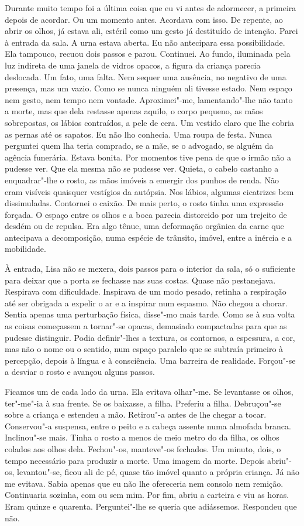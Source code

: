 Durante muito tempo foi a última coisa que eu vi antes de adormecer, a
primeira depois de acordar. Ou um momento antes. Acordava com isso. De
repente, ao abrir os olhos, já estava ali, estéril como um gesto já
destituído de intenção. Parei à entrada da sala. A urna estava aberta.
Eu não antecipara essa possibilidade. Ela tampouco, recuou dois passos
e parou. Continuei. Ao fundo, iluminada pela luz indireta de uma janela
de vidros opacos, a figura da criança parecia deslocada. Um fato, uma
falta. Nem sequer uma ausência, no negativo de uma presença, mas um
vazio. Como se nunca ninguém ali tivesse estado. Nem espaço nem gesto,
nem tempo nem vontade. Aproximei"-me, lamentando"-lhe não tanto a morte,
mas que dela restasse apenas aquilo, o corpo pequeno, as mãos
sobrepostas, os lábios contraídos, a pele de cera. Um vestido claro que
lhe cobria as pernas até os sapatos. Eu não lho conhecia. Uma roupa de
festa. Nunca perguntei quem lha teria comprado, se a mãe, se o advogado,
se alguém da agência funerária. Estava bonita. Por momentos tive pena de
que o irmão não a pudesse ver. Que ela mesma não se pudesse ver. Quieta,
o cabelo castanho a enquadrar"-lhe o rosto, as mãos imóveis a emergir
dos punhos de renda. Não eram visíveis quaisquer vestígios da autópsia.
Nos lábios, algumas cicatrizes bem dissimuladas. Contornei o caixão. De
mais perto, o rosto tinha uma expressão forçada. O espaço entre os olhos
e a boca parecia distorcido por um trejeito de desdém ou de repulsa. Era
algo tênue, uma deformação orgânica da carne que antecipava a
decomposição, numa espécie de trânsito, imóvel, entre a inércia e a
mobilidade.

À entrada, Lisa não se mexera, dois passos para o interior da sala, só o
suficiente para deixar que a porta se fechasse nas suas costas. Quase
não pestanejava. Respirava com dificuldade. Inspirava de um modo pesado,
retinha a respiração até ser obrigada a expelir o ar e a inspirar num
espasmo. Não chegou a chorar. Sentia apenas uma perturbação física,
disse"-mo mais tarde. Como se à sua volta as coisas começassem a
tornar"-se opacas, demasiado compactadas para que as pudesse distinguir.
Podia definir"-lhes a textura, os contornos, a espessura, a cor, mas não
o nome ou o sentido, num espaço paralelo que se subtraía primeiro à
percepção, depois à língua e à consciência. Uma barreira de realidade.
Forçou"-se a desviar o rosto e avançou alguns passos.

Ficamos um de cada lado da urna. Ela evitava olhar"-me. Se levantasse os
olhos, ter"-me"-ia à sua frente. Se os baixasse, a filha. Preferiu a
filha. Debruçou"-se sobre a criança e estendeu a mão. Retirou"-a antes
de lhe chegar a tocar. Conservou"-a suspensa, entre o peito e a cabeça
assente numa almofada branca. Inclinou"-se mais. Tinha o rosto a menos
de meio metro do da filha, os olhos colados aos olhos dela. Fechou"-os,
manteve"-os fechados. Um minuto, dois, o tempo necessário para produzir
a morte. Uma imagem da morte. Depois abriu"-os, levantou"-se, ficou ali
de pé, quase tão imóvel quanto a própria criança. Já não me evitava.
Sabia apenas que eu não lhe ofereceria nem consolo nem remição.
Continuaria sozinha, com ou sem mim. Por fim, abriu a carteira e viu as
horas. Eram quinze e quarenta. Perguntei"-lhe se queria que adiássemos.
Respondeu que não.

